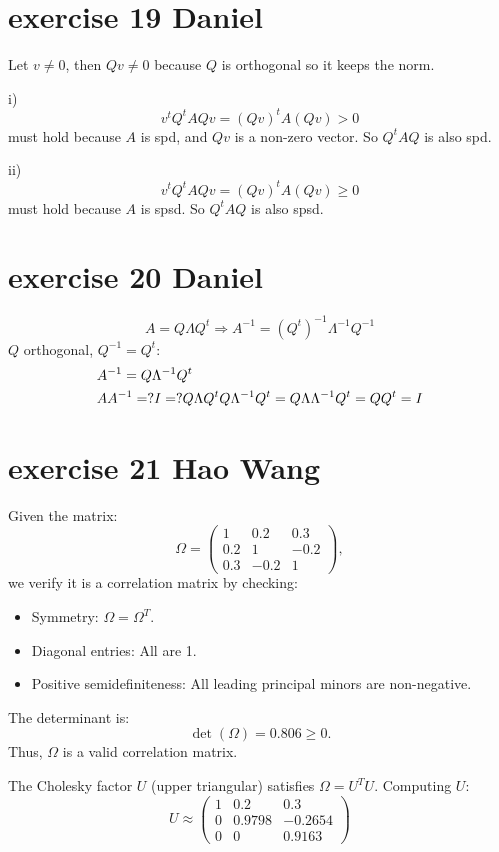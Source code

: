 \documentclass{article}
\begin{document}
\section{exercise 19 Daniel}
Let $v \neq0$, then $Qv \neq 0$ because $Q$ is orthogonal so it keeps the norm.

i) \[{v^t}{Q^t}AQv = {\left( {Qv} \right)^t}A\left( {Qv} \right) > 0\]
must hold because $A$ is spd, and $Qv$ is a non-zero vector. So $Q^tAQ$ is also spd.

ii) \[{v^t}{Q^t}AQv = {\left( {Qv} \right)^t}A\left( {Qv} \right) \geqslant 0\]
must hold because $A$ is spsd. So $Q^tAQ$ is also spsd.

\section{exercise 20 Daniel}
\[A = Q\Lambda {Q^t} \Rightarrow {A^{ - 1}} = {\left( {{Q^t}} \right)^{ - 1}}{\Lambda ^{ - 1}}{Q^{ - 1}}\]
$Q$ orthogonal, $Q^{-1} = Q^t$:
\[\begin{gathered}
        {A^{ - 1}} = Q{\Lambda ^{ - 1}}{Q^t} \hfill \\
        A{A^{ - 1}} = ?I = ?Q\Lambda {Q^t}Q{\Lambda ^{ - 1}}{Q^t} = Q\Lambda {\Lambda ^{ - 1}}{Q^t} = Q{Q^t} = I \hfill \\
    \end{gathered} \]
    
\section{exercise 21 Hao Wang}

Given the matrix:
\[
\Omega = \begin{pmatrix}
1 & 0.2 & 0.3 \\
0.2 & 1 & -0.2 \\
0.3 & -0.2 & 1
\end{pmatrix},
\]
we verify it is a correlation matrix by checking:
\begin{itemize}
    \item Symmetry: \(\Omega = \Omega^T\).
    \item Diagonal entries: All are 1.
    \item Positive semidefiniteness: All leading principal minors are non-negative.
\end{itemize}

The determinant is:
\[
\det(\Omega) = 0.806 \geq 0.
\]
Thus, \(\Omega\) is a valid correlation matrix.

The Cholesky factor \(U\) (upper triangular) satisfies \(\Omega = U^TU\). Computing \(U\):
\[
U \approx \begin{pmatrix}
1 & 0.2 & 0.3 \\
0 & 0.9798 & -0.2654 \\
0 & 0 & 0.9163
\end{pmatrix}
\]
\end{document}

